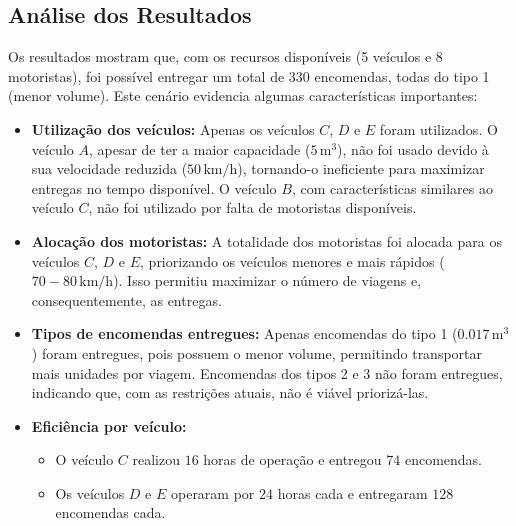 \subsection{Análise dos Resultados}\label{subsec:analise-detalhada-dos-resultados}
Os resultados mostram que, com os recursos disponíveis (5 veículos e 8 motoristas), foi possível entregar um total de 330 encomendas, todas do tipo 1 (menor volume).
Este cenário evidencia algumas características importantes:
\begin{itemize}
    \item \textbf{Utilização dos veículos:} Apenas os veículos \(C\), \(D\) e \(E\) foram utilizados. O veículo \(A\), apesar de ter a maior capacidade (\(5 \, \mathrm{m^3}\)), não foi usado devido à sua velocidade reduzida (\(50 \, \mathrm{km/h}\)), tornando-o ineficiente para maximizar entregas no tempo disponível.
    O veículo \(B\), com características similares ao veículo \(C\), não foi utilizado por falta de motoristas disponíveis.
    \item \textbf{Alocação dos motoristas:} A totalidade dos motoristas foi alocada para os veículos \(C\), \(D\) e \(E\), priorizando os veículos menores e mais rápidos (\(70-80 \, \mathrm{km/h}\)). Isso permitiu maximizar o número de viagens e, consequentemente, as entregas.
    \item \textbf{Tipos de encomendas entregues:} Apenas encomendas do tipo 1 (\(0.017 \, \mathrm{m^3}\)) foram entregues, pois possuem o menor volume, permitindo transportar mais unidades por viagem.
    Encomendas dos tipos 2 e 3 não foram entregues, indicando que, com as restrições atuais, não é viável priorizá-las.
    \item \textbf{Eficiência por veículo:}
    \begin{itemize}
        \item O veículo \(C\) realizou \(16\) horas de operação e entregou \(74\) encomendas.
        \item Os veículos \(D\) e \(E\) operaram por \(24\) horas cada e entregaram \(128\) encomendas cada.
    \end{itemize}
\end{itemize}

